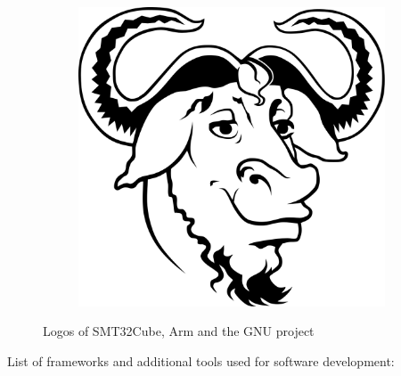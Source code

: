 \documentclass[a4paper,twoside,12pt]{book}
\begin{document}
\begin{figure}[H]
\begin{subfigure}[h]{0.3\textwidth}
    \end{subfigure}
    ~
    \begin{subfigure}[h]{0.3\textwidth}
        \includegraphics[width=\textwidth]{images/gnu_logo}
        \label{fig:gnu}
    \end{subfigure}
    \caption{Logos of SMT32Cube, Arm and the GNU project}
    \label{fig:tools}
\end{figure}

List of frameworks and additional tools used for software development:
\end{document}
